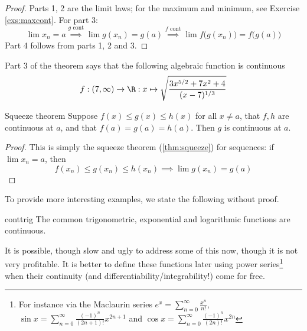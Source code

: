 \begin{proof}
Parts 1, 2 are the limit laws; for the maximum and minimum, see Exercise \ref{exs:maxcont}. For part 3:
\[\lim x_n=a\overset{g\text{ cont}}\implies \lim g(x_n)=g(a) 
\overset{f\text{ cont}}\implies \lim f\bigl(g(x_n)\bigr)=f\bigl(g(a)\bigr)\]
Part 4 follows from parts 1, 2 and 3. 
\end{proof}


\begin{example}{}{}
Part 3 of the theorem says that the following algebraic function is continuous
\[f:(7,\infty)\to\R:x\mapsto \sqrt{\frac{3x^{5/2}+7x^2+4}{(x-7)^{1/3}}}\]
\end{example}

\goodbreak


\begin{thm}{Squeeze theorem}{}
Suppose $f(x)\le g(x)\le h(x)$ for all $x\neq a$, that $f,h$ are continuous at $a$, and that $f(a)=g(a)=h(a)$. Then $g$ is continuous at $a$. 
\end{thm}

\begin{proof}
This is simply the squeeze theorem (\ref{thm:squeeze}) for sequences: if $\lim x_n=a$, then
\[f(x_n)\le g(x_n)\le h(x_n)\implies \lim g(x_n)=g(a)\tag*{\qedhere}\]
\end{proof}

To provide more interesting examples, we state the following without proof.

\begin{thm}{}{conttrig}
The common trigonometric, exponential and logarithmic functions are continuous.
\end{thm}

It is possible, though slow and ugly to address some of this now, though it is not very profitable. It is better to define these functions later using power series\footnote{For instance via the Maclaurin series $e^x=\sum\limits_{n=0}^\infty\frac{x^n}{n!}$, $\sin x=\sum\limits_{n=0}^\infty\frac{(-1)^n}{(2n+1)!}x^{2n+1}$ and $\cos x=\sum\limits_{n=0}^\infty\frac{(-1)^n}{(2n)!}x^{2n}$} when their continuity (and differentiability/integrability!) come for free.

